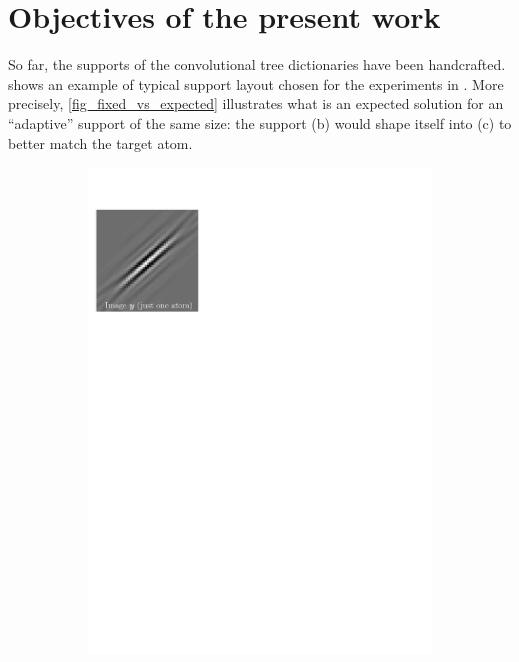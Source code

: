 \section{Objectives of the present work}

So far, the supports of the convolutional tree dictionaries have been handcrafted.  shows an example of typical support layout chosen for the experiments in \cite{chabiron_optimization_2016}. More precisely, \cref{fig_fixed_vs_expected} illustrates what is an expected solution for an “adaptive” support of the same size: the support (b) would shape itself into (c) to better match the target atom.

\begin{figure}[!ht]\centering
\begin{subfigure}[b]{0.32\textwidth}\centering
	\includegraphics[width=\textwidth]{figures/manual-better-support/target.pdf}

\end{subfigure}
\end{figure}
